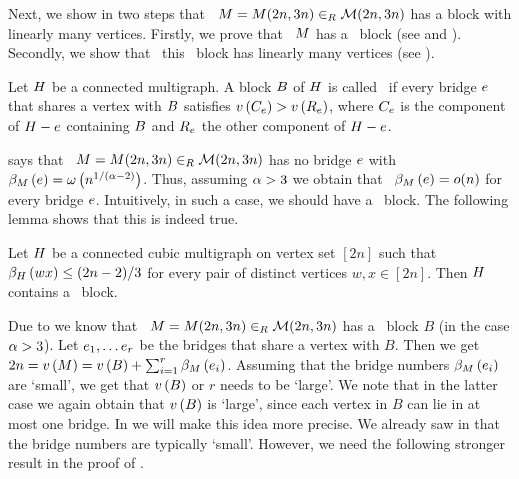 Next, we show in two steps that \whp\ $M=M(2n,3n)\in_R \mathcal{M}(2n,3n)$ has a block with linearly many vertices. Firstly, we prove that \whp\ $M$ has a \largeBlock\ block (see  and ). Secondly, we show that \whp\ this \largeBlock\ block has linearly many vertices (see ).
\begin{definition}\label{CBdef:large_block}
	Let $H$ be a connected multigraph. A block $B$ of $H$ is called \textit{\largeBlock}\ if every bridge $e$ that shares a vertex with $B$ satisfies $v\left({C_e}\right)>v\left({R_e}\right)$, where $C_e$ is the component of $H-e$ containing $B$ and $R_e$ the other component of $H-e$.
\end{definition}

 says that \whp\ $M=M(2n,3n)\in_R \mathcal{M}(2n,3n)$ has no bridge $e$ with $\beta_{M}\left(e\right)=\omega\left(n^{1/(\alpha-2)}\right)$. Thus, assuming $\alpha>3$ we obtain that \whp\ $\beta_{M}\left(e\right)=o(n)$ for every bridge $e$. Intuitively, in such a case, we should have a \largeBlock\ block. The following lemma shows that this is indeed true.
\begin{lem}\label{CBlem:bridge_number5}
	Let $H$ be a connected cubic multigraph on vertex set $[2n]$ such that $\beta_{H}\left(wx\right)\leq(2n-2)/3$ for every pair of distinct vertices $w,x \in [2n]$. Then $H$ contains a \largeBlock\ block. 
\end{lem}

Due to  we know that \whp\ $M=M(2n,3n)\in_R \mathcal{M}(2n,3n)$ has a \largeBlock\ block $B$ (in the case $\alpha>3$). Let $e_1, \ldots e_r$ be the bridges that share a vertex with $B$. Then we get $2n=v\left({M}\right)=v\left({B}\right)+\sum_{i=1}^{r}\beta_{M}\left(e_i\right)$. Assuming that the bridge numbers $\beta_{M}\left(e_i\right)$ are \lq small\rq, we get that $v\left({B}\right)$ or $r$ needs to be \lq large\rq. We note that in the latter case we again obtain that $v\left({B}\right)$ is \lq large\rq, since each vertex in $B$ can lie in at most one bridge. In  we will make this idea more precise. We already saw in  that the bridge numbers are typically \lq small\rq. However, we need the following stronger result in the proof of .

